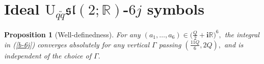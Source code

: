\documentclass[11pt]{article}
\newtheorem{proposition}[theorem]{Proposition}
\theoremstyle{remark}
\newcommand{\R}{\mathbb{R}}
\theoremstyle{remark}
\numberwithin{equation}{section}
\begin{document}








\section{Ideal $\mathrm {U}_{q\tilde q}\mathfrak{sl}(2;\mathbb R)$-$6j$ symbols}



\begin{proposition}[Well-definedness]\label{lem:ab-conver}
For any $(a_1,\ldots,a_6)\in\big(\frac{Q}{2}+\mathbf i \R\big)^6,$ the integral in
(\ref{b-6j}) converges absolutely for any vertical $\Gamma$ passing $(\frac{11Q}{6},2Q),$ and 
is independent of the choice of $\Gamma.$
\end{proposition}
\end{document}
